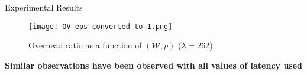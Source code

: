\documentclass{beamer}
\begin{document}

\begin{frame}{Experimental Results}

        \begin{figure}
            \texttt{[image: OV-eps-converted-to-1.png]}
            \caption{Overhead ratio as a function of $(\mathcal{W},p)$
                ($\lambda = 262$)} \label{fig:accuracy}
        \end{figure}
        \begin{center}
        \textbf{Similar observations have been observed with all values of latency used}
        \end{center}

\end{frame}
\end{document}
